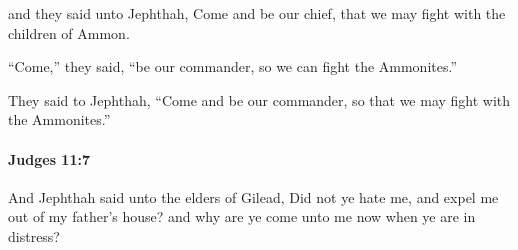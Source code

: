 			\begin{versebox}
					\item[BHS] 
					\item[ASV] and they said unto Jephthah, Come and be our chief, that we may fight with the children of Ammon.
					\item[NIV] “Come,” they said, “be our commander, so we can fight the Ammonites.”
					\item[NRSV] They said to Jephthah, “Come and be our commander, so that we may fight with the Ammonites.”
			\end{versebox}

		\paragraph{Judges 11:7} %
			\label{JUDGES-11-7}

			And Jephthah said unto the elders of Gilead, Did not ye hate me, and expel me out of my father’s house? and why are ye come unto me now when ye are in distress?

